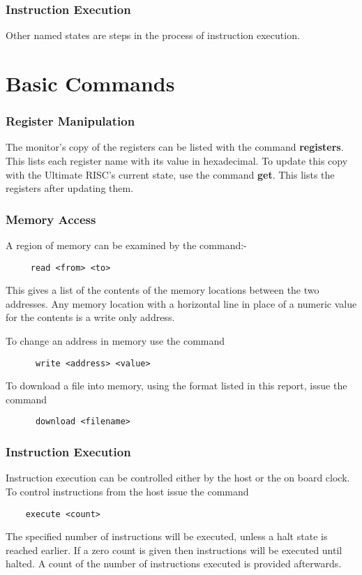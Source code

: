 \subsubsection{Instruction Execution}
Other named states are steps in the process of instruction execution.

\section{Basic Commands}

\subsubsection{Register Manipulation}
The monitor's copy of the registers can be listed with the command {\bf registers}.
This lists each register name with its value in hexadecimal.
To update this copy with the Ultimate RISC's current state, use the command
{\bf get}. 
This lists the registers after updating them.

\subsubsection{Memory Access}
A region of memory can be examined by the command:-
\begin{verbatim}
     read <from> <to>
\end{verbatim}  
This gives a list of the contents of the memory locations between the two addresses.
Any memory location  with a horizontal line in place of a numeric value for the contents is a write only address.

To change an address in memory use the command
\begin{verbatim}
      write <address> <value>
\end{verbatim}

To download a file into memory, using the format listed in this report, issue the command
\begin{verbatim}
      download <filename>
      \end{verbatim}

\subsubsection{Instruction Execution}
Instruction execution can be controlled either by the  host or the on board clock.
To control instructions from the host issue the command
\begin{verbatim}
	execute <count>
\end{verbatim}
The specified number of instructions will be executed, unless a halt state is reached earlier. 
If a zero count is given then instructions will be executed until halted.
A count of the number of instructions executed is provided afterwards.

